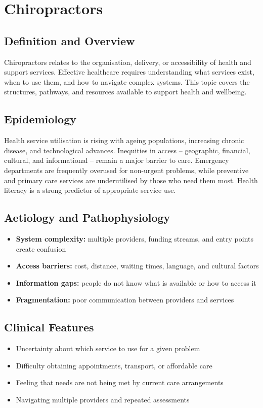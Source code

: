 \chapter{Chiropractors}

\section*{Definition and Overview}
Chiropractors relates to the organisation, delivery, or accessibility of health and support services. Effective healthcare requires understanding what services exist, when to use them, and how to navigate complex systems. This topic covers the structures, pathways, and resources available to support health and wellbeing.

\section*{Epidemiology}
Health service utilisation is rising with ageing populations, increasing chronic disease, and technological advances. Inequities in access -- geographic, financial, cultural, and informational -- remain a major barrier to care. Emergency departments are frequently overused for non-urgent problems, while preventive and primary care services are underutilised by those who need them most. Health literacy is a strong predictor of appropriate service use.

\section*{Aetiology and Pathophysiology}
\begin{itemize}
    \item \textbf{System complexity:} multiple providers, funding streams, and entry points create confusion
    \item \textbf{Access barriers:} cost, distance, waiting times, language, and cultural factors
    \item \textbf{Information gaps:} people do not know what is available or how to access it
    \item \textbf{Fragmentation:} poor communication between providers and services
\end{itemize}

\section*{Clinical Features}
\begin{itemize}
    \item Uncertainty about which service to use for a given problem
    \item Difficulty obtaining appointments, transport, or affordable care
    \item Feeling that needs are not being met by current care arrangements
    \item Navigating multiple providers and repeated assessments
\end{itemize}

